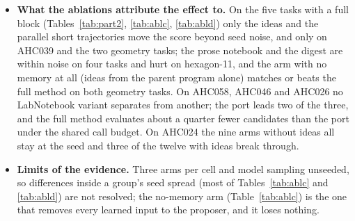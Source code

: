 \begin{itemize}
  are behind the 2026 systems by margins their extra compute explains.
\item \textbf{What the ablations attribute the effect to.} On the five tasks with a full block
  (Tables~\ref{tab:part2}, \ref{tab:ablc}, \ref{tab:abld}) only the ideas and the parallel short
  trajectories move the score beyond seed noise, and only on AHC039 and the two geometry tasks; the
  prose notebook and the digest are within noise on four tasks and hurt on hexagon-11, and the arm
  with no memory at all (ideas from the parent program alone) matches or beats the full method on
  both geometry tasks. On AHC058, AHC046
  and AHC026 no LabNotebook variant separates from another; the port leads two of the three, and the
  full method evaluates about a quarter fewer candidates than the port under the shared call budget.
  On AHC024 the nine arms without ideas all stay at the seed and three of the twelve with ideas break
  through.
\item \textbf{Limits of the evidence.} Three arms per cell and model sampling unseeded, so
  differences inside a group's seed spread (most of Tables~\ref{tab:ablc} and \ref{tab:abld}) are
  not resolved; the no-memory arm (Table~\ref{tab:ablc}) is the one that removes every learned
  input to the proposer, and it loses nothing.
\end{itemize}
